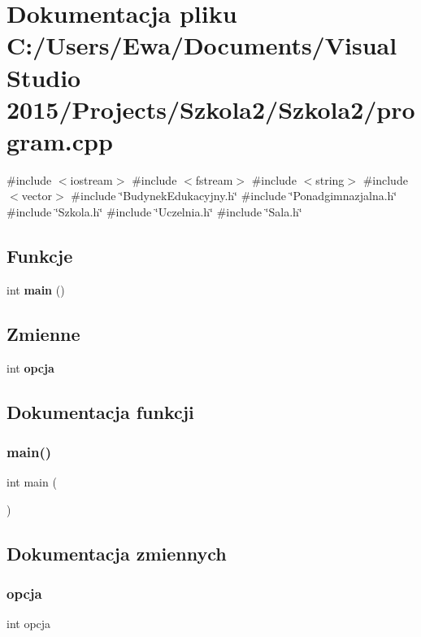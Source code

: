\section{Dokumentacja pliku C\+:/\+Users/\+Ewa/\+Documents/\+Visual Studio 2015/\+Projects/\+Szkola2/\+Szkola2/program.cpp}
\label{program_8cpp}
{\ttfamily \#include $<$iostream$>$}\newline
{\ttfamily \#include $<$fstream$>$}\newline
{\ttfamily \#include $<$string$>$}\newline
{\ttfamily \#include $<$vector$>$}\newline
{\ttfamily \#include \char`\"{}Budynek\+Edukacyjny.\+h\char`\"{}}\newline
{\ttfamily \#include \char`\"{}Ponadgimnazjalna.\+h\char`\"{}}\newline
{\ttfamily \#include \char`\"{}Szkola.\+h\char`\"{}}\newline
{\ttfamily \#include \char`\"{}Uczelnia.\+h\char`\"{}}\newline
{\ttfamily \#include \char`\"{}Sala.\+h\char`\"{}}\newline
\subsection*{Funkcje}
\begin{DoxyCompactItemize}
\item 
int \textbf{ main} ()
\end{DoxyCompactItemize}
\subsection*{Zmienne}
\begin{DoxyCompactItemize}
\item 
int \textbf{ opcja}
\end{DoxyCompactItemize}


\subsection{Dokumentacja funkcji}
\mbox{\label{program_8cpp_ae66f6b31b5ad750f1fe042a706a4e3d4}} 
\subsubsection{main()}
{\footnotesize\ttfamily int main (\begin{DoxyParamCaption}{ }\end{DoxyParamCaption})}



\subsection{Dokumentacja zmiennych}
\mbox{\label{program_8cpp_adaeb9433eaa673c6d8c4793b5bfd9ec3}} 
\subsubsection{opcja}
{\footnotesize\ttfamily int opcja}

